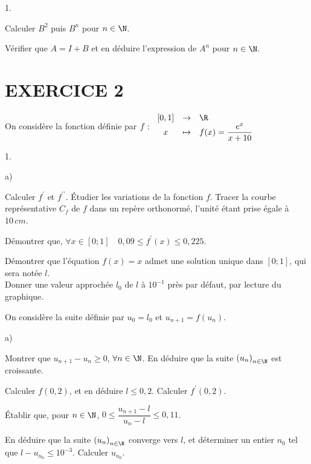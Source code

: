 \documentclass[11pt]{article}%
\begin{document}
\begin{noliste}{1.}
 \setlength{\itemsep}{4mm}
\item Calculer $B^{2}$ puis $B^{n}$ pour $n\in \N$.

\item Vérifier que $A = I + B$ et en déduire l'expression de $A^{n}$
pour $n\in 
\N$.
\end{noliste}

\section*{EXERCICE 2}

On considère la fonction définie par $f :\left. 
\begin{array}{ccl}
\lbrack 0,1] & \rightarrow & \R \\
x & \mapsto & f(x) = \dfrac{e^{x}}{x + 10}
\end{array}
\right. $

\begin{noliste}{1.}
 \setlength{\itemsep}{4mm}
\item 

\begin{noliste}{a)}
 \setlength{\itemsep}{2mm}
\item Calculer $f^{\prime }$ et $f^{\prime \prime }$. Étudier les
variations
de la fonction $f$. Tracer la courbe représentative $C_{f}$ de $f$ dans
un
repère orthonormé, l'unité étant prise égale à $10\,cm$.

\item Démontrer que, $\forall x\in \left[ 0;1\right] \quad 0,09\leq
f^{\prime }\left( x\right) \leq 0,225$.

\item Démontrer que l'équation $f\left( x\right) = x$ admet une
solution
unique dans $\left[ 0;1\right] $, qui sera notée $l$.\\
Donner une valeur approchée $l_{0}$ de $l$ à $10^{-1}$ près par défaut,
par
lecture du graphique.
\end{noliste}

\item On considère la suite définie par $u_{0} = l_{0}$ et $u_{n + 1} =
f\left(
u_{n}\right) $.

\begin{noliste}{a)}
 \setlength{\itemsep}{2mm}
\item Montrer que $u_{n + 1}-u_{n}\geq 0$, $\forall n\in \N$. En
déduire que la suite $\left( u_{n}\right)_{n\in \N}$ est croissante.

\item Calculer $f\left( 0,2\right) $, et en déduire $l\leq 0,2$.
Calculer $f^{\prime }\left( 0,2\right) $.

\item Établir que, pour $n\in \N$, $0\leq \dfrac{u_{n +
1}-l}{u_{n}-l}\leq 0,11$.

\item En déduire que la suite $\left( u_{n}\right)_{n\in \N}$
converge vers $l$, et déterminer un entier $n_{0}$ tel que
$l-u_{n_{0}}\leq 10^{-3}$. Calculer $u_{n_{0}}.$
\end{noliste}
\end{noliste}
\end{document}
